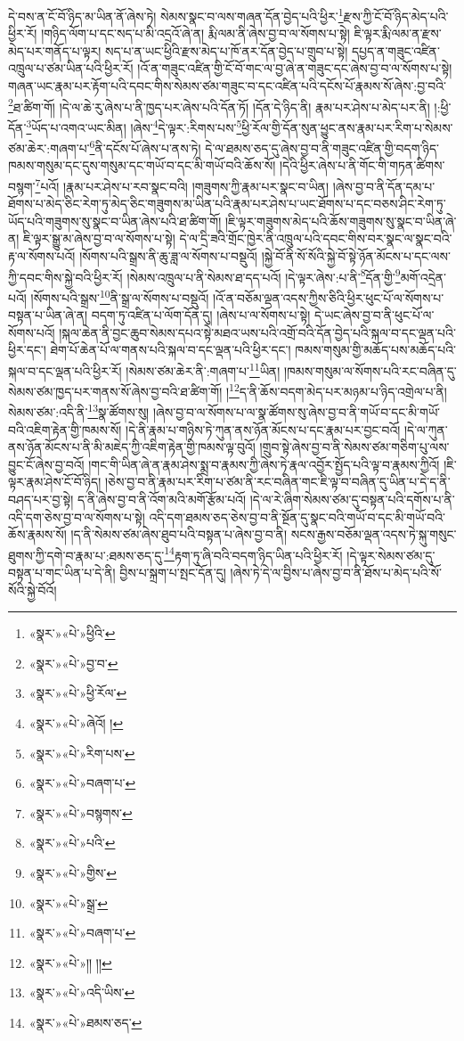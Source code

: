 དེ་བས་ན་ངོ་བོ་ཉིད་མ་ཡིན་ནོ་ཞེས་ཏེ། སེམས་སྣང་བ་ལས་གཞན་དོན་བྱེད་པའི་ཕྱིར་\footnote{«སྣར་»«པེ་»ཕྱིའི་}རྫས་ཀྱི་ངོ་བོ་ཉིད་མེད་པའི་ཕྱིར་རོ། །གཉིད་ལོག་པ་དང་སད་པ་མི་འདྲའོ་ཞེ་ན། རྨི་ལམ་ནི་ཞེས་བྱ་བ་ལ་སོགས་པ་སྟེ། ཇི་ལྟར་རྨི་ལམ་ན་རྫས་མེད་པར་གནོད་པ་ལྟར། སད་པ་ན་ཡང་ཕྱིའི་རྫས་མེད་པ་ཁོ་ནར་དོན་བྱེད་པ་གྲུབ་པ་སྟེ། དཔྱད་ན་གཟུང་འཛིན་འཁྲུལ་པ་ཙམ་ཡིན་པའི་ཕྱིར་རོ། །འོ་ན་གཟུང་འཛིན་གྱི་ངོ་བོ་གང་ལ་བྱ་ཞེ་ན་གཟུང་དང་ཞེས་བྱ་བ་ལ་སོགས་པ་སྟེ། གཞན་ཡང་རྣམ་པར་རྟོག་པའི་དབང་གིས་སེམས་ཙམ་གཟུང་བ་དང་འཛིན་པའི་དངོས་པོ་རྣམས་སོ་ཞེས་:བྱ་བའི་\footnote{«སྣར་»«པེ་»བྱ་བ་}ཐ་ཚིག་གོ། །དེ་ལ་ཆེ་རུ་ཞེས་པ་ནི་ཁྱད་པར་ཞེས་པའི་དོན་ཏོ། །དོན་དེ་ཉིད་ནི། རྣམ་པར་ཤེས་པ་མེད་པར་ནི། །:ཕྱི་དོན་\footnote{«སྣར་»«པེ་»ཕྱི་རོལ་}ཡོད་པ་འགའ་ཡང་མིན། །ཞེས་\footnote{«སྣར་»«པེ་»ཞེའོ། །}དེ་ལྟར་:རིགས་པས་\footnote{«སྣར་»«པེ་»རིག་པས་}ཕྱི་རོལ་གྱི་དོན་སུན་ཕྱུང་ནས་རྣམ་པར་རིག་པ་སེམས་ཙམ་ཆེར་:གཞག་པ་\footnote{«སྣར་»«པེ་»བཞག་པ་}ནི་དངོས་པོ་ཞེས་པ་ནས་ཏེ། དེ་ལ་ཐམས་ཅད་དུ་ཞེས་བྱ་བ་ནི་གཟུང་འཛིན་གྱི་བདག་ཉིད་ཁམས་གསུམ་དང་དུས་གསུམ་དང་གཡོ་བ་དང་མི་གཡོ་བའི་ཆོས་སོ། །དེའི་ཕྱིར་ཞེས་པ་ནི་གོང་གི་གཏན་ཚིགས་བསྙག་\footnote{«སྣར་»«པེ་»བསྙགས་}པའོ། །རྣམ་པར་ཤེས་པ་རབ་སྣང་བའི། །གཟུགས་ཀྱི་རྣམ་པར་སྣང་བ་ཡིན། །ཞེས་བྱ་བ་ནི་དོན་དམ་པ་ཐོགས་པ་མེད་ཅིང་རེག་ཏུ་མེད་ཅིང་གཟུགས་མ་ཡིན་པའི་རྣམ་པར་ཤེས་པ་ཡང་ཐོགས་པ་དང་བཅས་ཤིང་རེག་ཏུ་ཡོད་པའི་གཟུགས་སུ་སྣང་བ་ཡིན་ཞེས་པའི་ཐ་ཚིག་གོ། །ཇི་ལྟར་གཟུགས་མེད་པའི་ཆོས་གཟུགས་སུ་སྣང་བ་ཡིན་ཞེ་ན། ཇི་ལྟར་སྒྱུ་མ་ཞེས་བྱ་བ་ལ་སོགས་པ་སྟེ། དེ་ལ་དྲི་ཟའི་གྲོང་ཁྱེར་ནི་འཁྲུལ་པའི་དབང་གིས་བར་སྣང་ལ་སྣང་བའི་རྟ་ལ་སོགས་པའོ། །སོགས་པའི་སྒྲས་ནི་ཆུ་ཟླ་ལ་སོགས་པ་བསྡུའོ། །སྐྱེ་བོ་ནི་སོ་སོའི་སྐྱེ་བོ་སྟེ་ཉོན་མོངས་པ་དང་ལས་ཀྱི་དབང་གིས་སྐྱེ་བའི་ཕྱིར་རོ། །སེམས་འཁྲུལ་པ་ནི་སེམས་ཐ་དད་པའོ། །དེ་ལྟར་ཞེས་:པ་ནི་\footnote{«སྣར་»«པེ་»པའི་}དོན་གྱི་\footnote{«སྣར་»«པེ་»གྱིས་}མགོ་འདྲེན་པའོ། །སོགས་པའི་སྒྲས་\footnote{«སྣར་»«པེ་»སྒྲ་}ནི་སྒྲ་ལ་སོགས་པ་བསྡུའོ། །འོ་ན་བཅོམ་ལྡན་འདས་ཀྱིས་ཅིའི་ཕྱིར་ཕུང་པོ་ལ་སོགས་པ་བསྟན་པ་ཡིན་ཞེ་ན། བདག་ཏུ་འཛིན་པ་ལོག་དོན་དུ། །ཞེས་པ་ལ་སོགས་པ་སྟེ། དེ་ཡང་ཞེས་བྱ་བ་ནི་ཕུང་པོ་ལ་སོགས་པའོ། །སྐལ་ཆེན་ནི་བྱང་ཆུབ་སེམས་དཔའ་སྟེ་མཐའ་ཡས་པའི་འགྲོ་བའི་དོན་བྱེད་པའི་སྐལ་བ་དང་ལྡན་པའི་ཕྱིར་དང་། ཐེག་པོ་ཆེན་པོ་ལ་གནས་པའི་སྐལ་བ་དང་ལྡན་པའི་ཕྱིར་དང་། ཁམས་གསུམ་གྱི་མཆོད་པས་མཆོད་པའི་སྐལ་བ་དང་ལྡན་པའི་ཕྱིར་རོ། །སེམས་ཙམ་ཆེར་ནི་:གཞག་པ་\footnote{«སྣར་»«པེ་»བཞག་པ་}ཡིན། །ཁམས་གསུམ་ལ་སོགས་པའི་རང་བཞིན་དུ་སེམས་ཙམ་ཁྱད་པར་གནས་སོ་ཞེས་བྱ་བའི་ཐ་ཚིག་གོ། །\footnote{«སྣར་»«པེ་»།། །།}ད་ནི་ཆོས་བདག་མེད་པར་མཉམ་པ་ཉིད་འགྲེལ་པ་ནི། སེམས་ཙམ་:འདི་ནི་\footnote{«སྣར་»«པེ་»འདི་ཡིས་}སྣ་ཚོགས་སུ། །ཞེས་བྱ་བ་ལ་སོགས་པ་ལ་སྣ་ཚོགས་སུ་ཞེས་བྱ་བ་ནི་གཡོ་བ་དང་མི་གཡོ་བའི་འཇིག་རྟེན་གྱི་ཁམས་སོ། །དེ་ནི་རྣམ་པ་གཉིས་ཏེ་ཀུན་ནས་ཉོན་མོངས་པ་དང་རྣམ་པར་བྱང་བའོ། །དེ་ལ་ཀུན་ནས་ཉོན་མོངས་པ་ནི་མི་མཇེད་ཀྱི་འཇིག་རྟེན་གྱི་ཁམས་ལྟ་བུའོ། །གྲུབ་སྟེ་ཞེས་བྱ་བ་ནི་སེམས་ཙམ་གཅིག་པུ་ལས་བྱུང་ངོ་ཞེས་བྱ་བའོ། །གང་གི་ཡིན་ཞེ་ན་རྣམ་ཤེས་སྨྲ་བ་རྣམས་ཀྱི་ཞེས་ཏེ་རྣལ་འབྱོར་སྤྱོད་པའི་ལྟ་བ་རྣམས་ཀྱིའོ། །ཇི་ལྟར་རྣམ་ཤེས་ངོ་བོ་ཉིད། །ཅེས་བྱ་བ་ནི་རྣམ་པར་རིག་པ་ཙམ་ནི་རང་བཞིན་གང་ཇི་ལྟ་བ་བཞིན་དུ་ཡིན་པ་དེ་ད་ནི་བཤད་པར་བྱ་སྟེ། ད་ནི་ཞེས་བྱ་བ་ནི་འོག་མའི་མགོ་རྩོམ་པའོ། །དེ་ལ་རེ་ཞིག་སེམས་ཙམ་དུ་བསྟན་པའི་དགོས་པ་ནི་འདི་དག་ཅེས་བྱ་བ་ལ་སོགས་པ་སྟེ། འདི་དག་ཐམས་ཅད་ཅེས་བྱ་བ་ནི་སྔོན་དུ་སྣང་བའི་གཡོ་བ་དང་མི་གཡོ་བའི་ཆོས་རྣམས་སོ། །ད་ནི་སེམས་ཙམ་ཞེས་ཐུབ་པའི་བསྟན་པ་ཞེས་བྱ་བ་ནི། སངས་རྒྱས་བཅོམ་ལྡན་འདས་ཏེ་སྐུ་གསུང་ཐུགས་ཀྱི་དགེ་བ་རྣམ་པ་:ཐམས་ཅད་དུ་\footnote{«སྣར་»«པེ་»ཐམས་ཅད་}རྟག་ཏུ་ཞི་བའི་བདག་ཉིད་ཡིན་པའི་ཕྱིར་རོ། །དེ་ལྟར་སེམས་ཙམ་དུ་བསྟན་པ་གང་ཡིན་པ་དེ་ནི། བྱིས་པ་སྐྲག་པ་སྤང་དོན་དུ། །ཞེས་ཏེ་དེ་ལ་བྱིས་པ་ཞེས་བྱ་བ་ནི་ཐོས་པ་མེད་པའི་སོ་སོའི་སྐྱེ་བོའོ། 